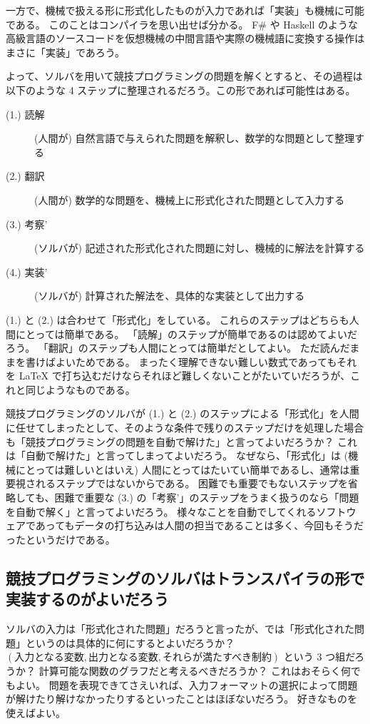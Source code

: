 \documentclass{ltjsarticle}
\begin{document}
一方で、機械で扱える形に形式化したものが入力であれば「実装」も機械に可能である。
このことはコンパイラを思い出せば分かる。
F\# や Haskell のような高級言語のソースコードを仮想機械の中間言語や実際の機械語に変換する操作はまさに「実装」であろう。

よって、ソルバを用いて競技プログラミングの問題を解くとすると、その過程は以下のような 4 ステップに整理されるだろう。この形であれば可能性はある。

\begin{description}
    \item[(1.) 読解] (人間が) 自然言語で与えられた問題を解釈し、数学的な問題として整理する
    \item[(2.) 翻訳] (人間が) 数学的な問題を、機械上に形式化された問題として入力する
    \item[(3.) 考察'] (ソルバが) 記述された形式化された問題に対し、機械的に解法を計算する
    \item[(4.) 実装'] (ソルバが) 計算された解法を、具体的な実装として出力する
\end{description}

(1.) と (2.) は合わせて「形式化」をしている。
これらのステップはどちらも人間にとっては簡単である。
「読解」のステップが簡単であるのは認めてよいだろう。
「翻訳」のステップも人間にとっては簡単だとしてよい。
ただ読んだままを書けばよいためである。
まったく理解できない難しい数式であってもそれを LaTeX で打ち込むだけならそれほど難しくないことがたいていだろうが、これと同じようなものである。

競技プログラミングのソルバが (1.) と (2.) のステップによる「形式化」を人間に任せてしまったとして、そのような条件で残りのステップだけを処理した場合も「競技プログラミングの問題を自動で解けた」と言ってよいだろうか？
これは「自動で解けた」と言ってしまってよいだろう。
なぜなら、「形式化」は (機械にとっては難しいとはいえ) 人間にとってはたいてい簡単であるし、通常は重要視されるステップではないからである。
困難でも重要でもないステップを省略しても、困難で重要な (3.) の「考察'」のステップをうまく扱うのなら「問題を自動で解く」と言ってよいだろう。
様々なことを自動でしてくれるソフトウェアであってもデータの打ち込みは人間の担当であることは多く、今回もそうだったというだけである。


\subsection{競技プログラミングのソルバはトランスパイラの形で実装するのがよいだろう}

ソルバの入力は「形式化された問題」だろうと言ったが、では「形式化された問題」というのは具体的に何にするとよいだろうか？
$(\text{入力となる変数}, \text{出力となる変数}, \text{それらが満たすべき制約})$ という $3$ つ組だろうか？
計算可能な関数のグラフだと考えるべきだろうか？
これはおそらく何でもよい。
問題を表現できてさえいれば、入力フォーマットの選択によって問題が解けたり解けなかったりするといったことはほぼないだろう。
好きなものを使えばよい。
\end{document}

